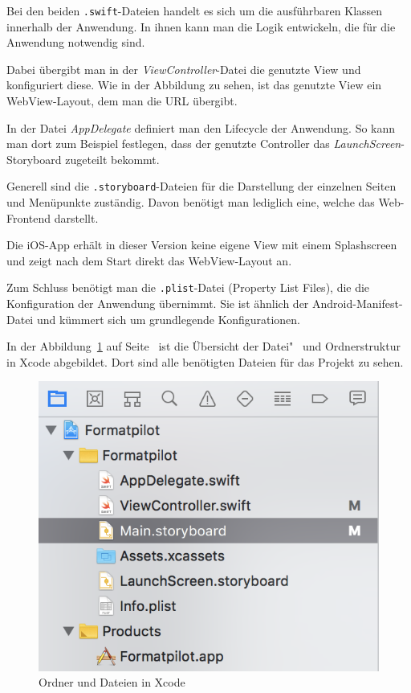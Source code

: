 Bei den beiden \texttt{.swift}-Dateien handelt es sich um die ausführbaren Klassen innerhalb der Anwendung. In ihnen
kann man die Logik entwickeln, die für die Anwendung notwendig sind.

Dabei übergibt man in der \textit{ViewController}-Datei die genutzte View und konfiguriert diese. Wie in der Abbildung
zu sehen, ist das genutzte View ein WebView-Layout, dem man die URL übergibt.

In der Datei \textit{AppDelegate} definiert man den Lifecycle der Anwendung. So kann man dort zum Beispiel festlegen,
dass der genutzte Controller das \textit{LaunchScreen}-Storyboard zugeteilt bekommt.

Generell sind die \texttt{.storyboard}-Dateien für die Darstellung der einzelnen Seiten und Menüpunkte zuständig. Davon
benötigt man lediglich eine, welche das Web-Frontend darstellt.

Die iOS-App erhält in dieser Version keine eigene View mit einem Splashscreen und zeigt nach dem Start direkt das
WebView-Layout an.

Zum Schluss benötigt man die \texttt{.plist}-Datei (Property List Files), die die Konfiguration der Anwendung übernimmt.
Sie ist ähnlich der Android-Manifest-Datei und kümmert sich um grundlegende Konfigurationen.

In der Abbildung~\ref{fig:umsetzung_ios_folder} auf Seite~\pageref{fig:umsetzung_ios_folder} ist die Übersicht der
Datei"~ und Ordnerstruktur in Xcode abgebildet. Dort sind alle benötigten Dateien für das Projekt zu sehen.

\begin{figure}[h]
    \centering
    \includegraphics[scale=0.6]{images/kapitel_4/ios_folder.png}
    \caption{Ordner und Dateien in Xcode}
    \label{fig:umsetzung_ios_folder}
\end{figure}

